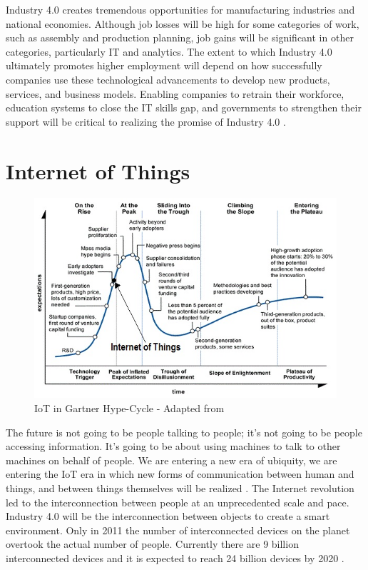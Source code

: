 Industry 4.0 creates tremendous opportunities for manufacturing industries and national economies. Although job losses will be high for some categories of work, such as assembly and production planning, job gains will be significant in other categories, particularly \acs{IT} and analytics. The extent to which Industry 4.0 ultimately promotes higher employment will depend on how successfully companies use these technological advancements to develop new products, services, and business models. Enabling companies to retrain their workforce, education systems to close the \acs{IT} skills gap, and governments to strengthen their support will be critical to realizing the promise of Industry 4.0 \cite{MANMACHINE,INDUSINTERNET}.
\section{Internet of Things} \label{IOT}
\begin{figure}[h!]
\includegraphics[scale=0.9]{./gfx/hypecycle}
\centering
\caption{\acs{IoT} in Gartner Hype-Cycle - Adapted from \cite{PICHYPECYC,HYPECYCGARTNER}}
\label{fig:2.6}
\end{figure}
The future is not going to be people talking to people; it's not going to be people accessing information. It's going to be about using machines to talk to other machines on behalf of people. We are entering a new era of ubiquity, we are entering the \acs{IoT} era in which new forms of communication between human and things, and between things themselves will be realized \cite{IOTFUTURE}. The Internet revolution led to the interconnection between people at an unprecedented scale and pace. Industry 4.0 will be the interconnection between objects to create a smart environment. Only in 2011 the number of interconnected devices on the planet overtook the actual number of people. Currently there are 9 billion interconnected devices and it is expected to reach 24 billion devices by 2020 \cite{IOTGUBBI}.

